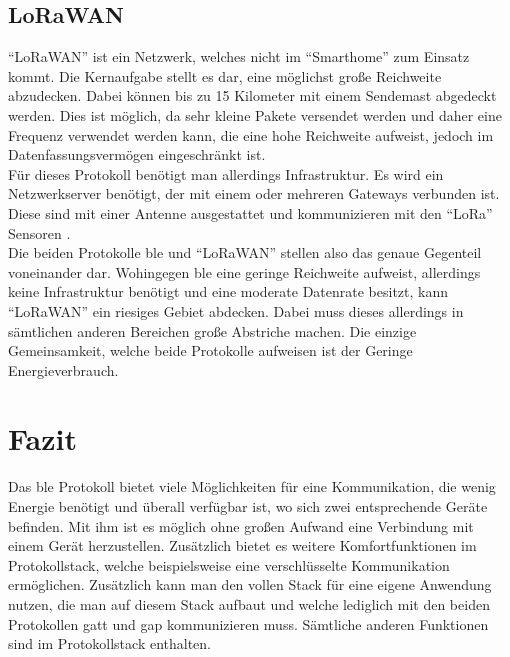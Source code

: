 \subsection{LoRaWAN}
\label{ss:vergleich:lora}

"`LoRaWAN"' ist ein Netzwerk, welches nicht im "`Smarthome"' zum Einsatz kommt. Die Kernaufgabe stellt es dar, eine möglichst große Reichweite abzudecken. Dabei können bis zu 15 Kilometer mit einem Sendemast abgedeckt werden. Dies ist möglich, da sehr kleine Pakete versendet werden und daher eine Frequenz verwendet werden kann, die eine hohe Reichweite aufweist, jedoch im Datenfassungsvermögen eingeschränkt ist.\\

\noindent Für dieses Protokoll benötigt man allerdings Infrastruktur. Es wird ein Netzwerkserver benötigt, der mit einem oder mehreren Gateways verbunden ist. Diese sind mit einer Antenne ausgestattet und kommunizieren mit den "`LoRa"' Sensoren \cite{LO:WWW}.\\

\noindent Die beiden Protokolle \ac{ble} und "`LoRaWAN"' stellen also das genaue Gegenteil voneinander dar. Wohingegen \ac{ble} eine geringe Reichweite aufweist, allerdings keine Infrastruktur benötigt und eine moderate Datenrate besitzt, kann "`LoRaWAN"' ein riesiges Gebiet abdecken. Dabei muss dieses allerdings in sämtlichen anderen Bereichen große Abstriche machen. Die einzige Gemeinsamkeit, welche beide Protokolle aufweisen ist der Geringe Energieverbrauch.\\ 

\section{Fazit}
\label{s:fazit}

Das \ac{ble} Protokoll bietet viele Möglichkeiten für eine Kommunikation, die wenig Energie benötigt und überall verfügbar ist, wo sich zwei entsprechende Geräte befinden. Mit ihm ist es möglich ohne großen Aufwand eine Verbindung mit einem Gerät herzustellen. Zusätzlich bietet es weitere Komfortfunktionen im Protokollstack, welche beispielsweise eine verschlüsselte Kommunikation ermöglichen. Zusätzlich kann man den vollen Stack für eine eigene Anwendung nutzen, die man auf diesem Stack aufbaut und welche lediglich mit den beiden Protokollen \ac{gatt} und \ac{gap} kommunizieren muss. Sämtliche anderen Funktionen sind im Protokollstack enthalten.\\

